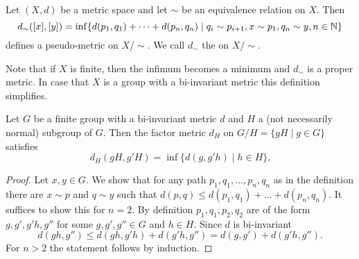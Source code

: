 \begin{definition}
	Let $(X,d)$ be a metric space and let $\sim$ be an equivalence relation on $X$. Then \[d_\sim([x],[y])=\inf\{d(p_1,q_1)+\dots+d(p_n,q_n)\mid q_i\sim p_{i+1}, x\sim p_1, q_n\sim y, n\in\mathbb{N}\}\] defines a pseudo-metric on $X/{\sim}$. We call  $d_\sim$ the  on $X/\sim$.
\end{definition}
Note that if $X$ is finite, then the infimum becomes a minimum and $d_\sim$ is a proper metric.
In case that $X$ is a group with a bi-invariant metric this definition simplifies.
\begin{lemma}\label{lem:factorMetric}
	Let $G$ be a finite group with a bi-invariant metric $d$ and $H$ a (not necessarily normal) subgroup of $G$. Then the factor metric $d_H$ on $G/H=\{gH\mid g\in G\}$ satisfies \[d_H(gH,g'H)=\inf\{d(g,g'h)\mid h\in H\}.\]
\end{lemma}
\begin{proof}
	Let $x,y\in G$. We show that for any path $p_1,q_1,\dots,p_n,q_n$ as in the definition there are $x\sim p$ and $q\sim y$ such that $d(p,q)\leq d(p_1,q_1)+\dots+d(p_n,q_n)$. It suffices to show this for $n=2$. 
	By definition $p_1,q_1,p_2,q_2$ are of the form $g,g',g'h,g''$ for some $g,g',g''\in G$ and $h\in H$. Since $d$ is bi-invariant 
	\[d(gh,g'')\leq d(gh,g'h)+d(g'h,g'')=d(g,g')+d(g'h,g'').\]
	For $n>2$ the statement follows by induction.
\end{proof}
		
